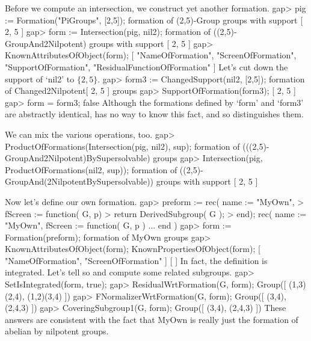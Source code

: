 Before we compute an intersection, we construct yet another formation.
\beginexample
gap> pig := Formation("PiGroups", [2,5]);
formation of (2,5)-Group groups with support [ 2, 5 ]
gap> form := Intersection(pig, nil2);
formation of ((2,5)-GroupAnd2Nilpotent) groups with support [ 2, 5 ]
gap> KnownAttributesOfObject(form);
[ "NameOfFormation", "ScreenOfFormation", "SupportOfFormation", 
  "ResidualFunctionOfFormation" ]
\endexample
 Let's cut down the support of `nil2' to $\{2,5\}$.
\beginexample
gap> form3 := ChangedSupport(nil2, [2,5]);
formation of Changed2Nilpotent[ 2, 5 ] groups 
gap> SupportOfFormation(form3);
[ 2, 5 ]
gap> form = form3;
false
\endexample
Although the formations defined by `form' and `form3' are abstractly
identical, {\GAP} has no way to know this fact, and so distinguishes
them.

We can mix the various operations, too.
\beginexample
gap> ProductOfFormations(Intersection(pig, nil2), sup);
formation of (((2,5)-GroupAnd2Nilpotent)BySupersolvable) groups 
gap> Intersection(pig, ProductOfFormations(nil2, sup));
formation of ((2,5)-GroupAnd(2NilpotentBySupersolvable)) groups with support 
[ 2, 5 ]
\endexample

  Now let's define our own formation.
\beginexample
gap> preform := rec( name := "MyOwn", 
>  fScreen := function( G, p)
>  return DerivedSubgroup( G );
>  end);
rec( name := "MyOwn", fScreen := function( G, p ) ... end )
gap> form := Formation(preform);
formation of MyOwn groups 
gap> KnownAttributesOfObject(form); KnownPropertiesOfObject(form);
[ "NameOfFormation", "ScreenOfFormation" ]
[  ]
\endexample
In fact, the definition is integrated. Let's tell {\GAP} so and compute
some related subgroups.
\beginexample
gap> SetIsIntegrated(form, true);
gap> ResidualWrtFormation(G, form);
Group([ (1,3)(2,4), (1,2)(3,4) ])
gap> FNormalizerWrtFormation(G, form);
Group([ (3,4), (2,4,3) ])
gap> CoveringSubgroup1(G, form);
Group([ (3,4), (2,4,3) ])
\endexample
These answers are consistent with the fact that MyOwn is really just the
formation of abelian by nilpotent groups.
